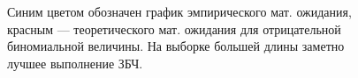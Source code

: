 \documentclass[12pt, a4paper]{article}
\begin{document}
\begin{figure}[H]
\caption{Синим цветом обозначен график эмпирического мат. ожидания, красным --- теоретического мат. ожидания для отрицательной биномиальной величины. На выборке большей длины заметно лучшее выполнение ЗБЧ.}
\end{figure}
\end{document}
